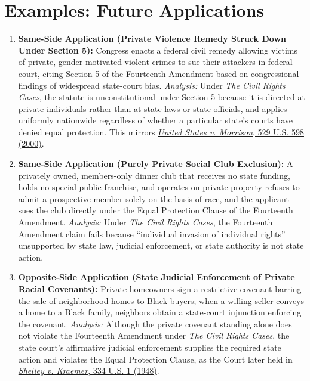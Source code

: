 \documentclass[12pt]{article}
\begin{document}
\section{Examples: Future Applications}

\begin{enumerate}
\item \textbf{Same-Side Application (Private Violence Remedy Struck Down Under Section 5):} Congress enacts a federal civil remedy allowing victims of private, gender-motivated violent crimes to sue their attackers in federal court, citing Section 5 of the Fourteenth Amendment based on congressional findings of widespread state-court bias. \textit{Analysis:} Under \textit{The Civil Rights Cases}, the statute is unconstitutional under Section 5 because it is directed at private individuals rather than at state laws or state officials, and applies uniformly nationwide regardless of whether a particular state's courts have denied equal protection. This mirrors \href{https://supreme.justia.com/cases/federal/us/529/598/}{\textit{United States v. Morrison}, 529 U.S. 598 (2000)}.

\item \textbf{Same-Side Application (Purely Private Social Club Exclusion):} A privately owned, members-only dinner club that receives no state funding, holds no special public franchise, and operates on private property refuses to admit a prospective member solely on the basis of race, and the applicant sues the club directly under the Equal Protection Clause of the Fourteenth Amendment. \textit{Analysis:} Under \textit{The Civil Rights Cases}, the Fourteenth Amendment claim fails because ``individual invasion of individual rights'' unsupported by state law, judicial enforcement, or state authority is not state action.

\item \textbf{Opposite-Side Application (State Judicial Enforcement of Private Racial Covenants):} Private homeowners sign a restrictive covenant barring the sale of neighborhood homes to Black buyers; when a willing seller conveys a home to a Black family, neighbors obtain a state-court injunction enforcing the covenant. \textit{Analysis:} Although the private covenant standing alone does not violate the Fourteenth Amendment under \textit{The Civil Rights Cases}, the state court's affirmative judicial enforcement supplies the required state action and violates the Equal Protection Clause, as the Court later held in \href{https://supreme.justia.com/cases/federal/us/334/1/}{\textit{Shelley v. Kraemer}, 334 U.S. 1 (1948)}.


\end{enumerate}
\end{document}
